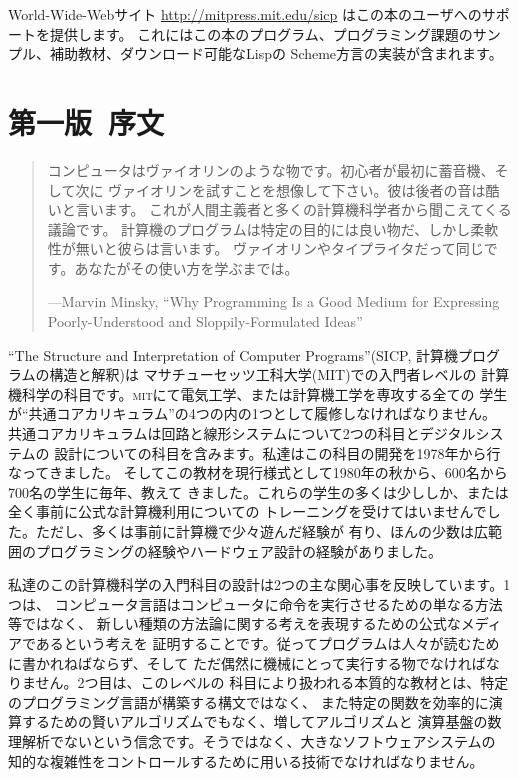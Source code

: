 \documentclass[oneside]{book}
\newcommand{\acronym}[1]{\textsc{\MakeLowercase{#1}}}
\begin{document}
World-Wide-Webサイト \href{http://mitpress.mit.edu/sicp}{http://mitpress.mit.edu/sicp} はこの本のユーザへのサポートを提供します。
これにはこの本のプログラム、プログラミング課題のサンプル、補助教材、ダウンロード可能なLispの
Scheme方言の実装が含まれます。


\chapter*{第一版~序文}
\label{Preface 1e}

\begin{quote}
コンピュータはヴァイオリンのような物です。初心者が最初に蓄音機、そして次に
ヴァイオリンを試すことを想像して下さい。彼は後者の音は酷いと言います。
これが人間主義者と多くの計算機科学者から聞こえてくる議論です。
計算機のプログラムは特定の目的には良い物だ、しかし柔軟性が無いと彼らは言います。
ヴァイオリンやタイプライタだって同じです。あなたがその使い方を学ぶまでは。

---Marvin Minsky, ``Why Programming Is a Good Medium for Expressing
Poorly-Understood and Sloppily-Formulated Ideas''
\end{quote}

\vspace{0.8em}

\noindent
``The Structure and Interpretation of Computer Programs''(SICP, 計算機プログラムの構造と解釈)は
マサチューセッツ工科大学(MIT)での入門者レベルの
計算機科学の科目です。\acronym{MIT}にて電気工学、または計算機工学を専攻する全ての
学生が``共通コアカリキュラム''の4つの内の1つとして履修しなければなりません。
共通コアカリキュラムは回路と線形システムについて2つの科目とデジタルシステムの
設計についての科目を含みます。私達はこの科目の開発を1978年から行なってきました。
そしてこの教材を現行様式として1980年の秋から、600名から700名の学生に毎年、教えて
きました。これらの学生の多くは少ししか、または全く事前に公式な計算機利用についての
トレーニングを受けてはいませんでした。ただし、多くは事前に計算機で少々遊んだ経験が
有り、ほんの少数は広範囲のプログラミングの経験やハードウェア設計の経験がありました。

私達のこの計算機科学の入門科目の設計は2つの主な関心事を反映しています。1つは、
コンピュータ言語はコンピュータに命令を実行させるための単なる方法等ではなく、
新しい種類の方法論に関する考えを表現するための公式なメディアであるという考えを
証明することです。従ってプログラムは人々が読むために書かれねばならず、そして
ただ偶然に機械にとって実行する物でなければなりません。2つ目は、このレベルの
科目により扱われる本質的な教材とは、特定のプログラミング言語が構築する構文ではなく、
また特定の関数を効率的に演算するための賢いアルゴリズムでもなく、増してアルゴリズムと
演算基盤の数理解析でないという信念です。そうではなく、大きなソフトウェアシステムの
知的な複雑性をコントロールするために用いる技術でなければなりません。
\end{document}
